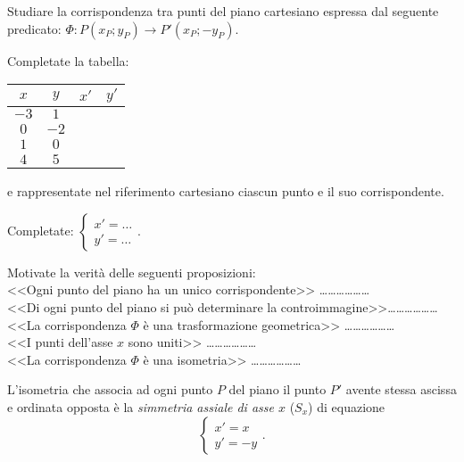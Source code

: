 \begin{exrig}
\begin{esempio}
Studiare la corrispondenza tra punti del piano cartesiano espressa dal seguente predicato: $\Phi:P(x_P;y_P) \rightarrow P'(x_P;-y_P)$.\vspace{7pt}

Completate la tabella: 
\begin{center}
\begin{tabular}{cccc}
\toprule
$x$ & $y$ & $x'$ & $y'$\\
\midrule
$-3$ & $1$ &  &  \\
$0$ & $-2$ &  &  \\
$1$ & $0$ & &  \\
$4$ & $5$ & &  \\
\bottomrule
\end{tabular}
\end{center}

e rappresentate nel riferimento cartesiano ciascun punto e il suo corrispondente.

Completate: $\begin{cases}x'=\ldots{} \\ y'=\ldots{}\end{cases}$.

Motivate la verità delle seguenti proposizioni:\\
<<Ogni punto del piano ha un unico corrispondente>> \ldots\ldots\ldots\ldots\ldots\ldots{}\\
<<Di ogni punto del piano si può determinare la controimmagine>>\ldots\ldots\ldots\ldots\ldots\ldots{}\\
<<La corrispondenza $\Phi$ è una trasformazione geometrica>> \ldots\ldots\ldots\ldots\ldots\ldots{}\\
<<I punti dell'asse $x$ sono uniti>> \ldots\ldots\ldots\ldots\ldots\ldots{}\\
<<La corrispondenza $\Phi$ è una isometria>> \ldots\ldots\ldots\ldots\ldots\ldots{}
\end{esempio}	
\end{exrig}

\begin{definizione}
L'isometria che associa ad ogni punto $P$ del piano il punto $P'$ avente stessa ascissa e ordinata opposta è la \emph{simmetria assiale di asse $x$} ($S_x$) di equazione
\[\begin{cases}x'=x\\ y'=-y\end{cases}.\]
\end{definizione}
 
